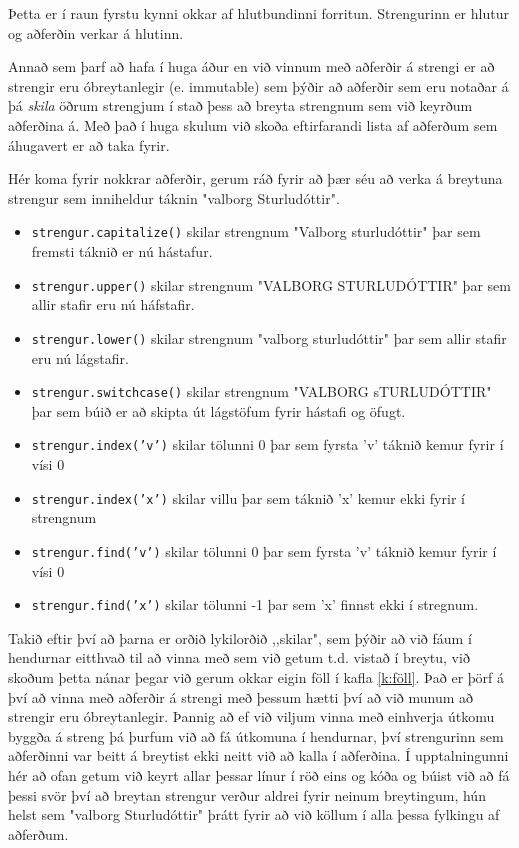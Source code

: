 Þetta er í raun fyrstu kynni okkar af hlutbundinni forritun.
Strengurinn er hlutur og aðferðin verkar á hlutinn.

Annað sem þarf að hafa í huga áður en við vinnum með aðferðir á strengi er að strengir eru óbreytanlegir (e. immutable) sem þýðir að aðferðir sem eru notaðar á þá \emph{skila} öðrum strengjum í stað þess að breyta strengnum sem við keyrðum aðferðina á.
Með það í huga skulum við skoða eftirfarandi lista af aðferðum sem áhugavert er að taka fyrir.
\vspace{10px}

Hér koma fyrir nokkrar aðferðir, gerum ráð fyrir að þær séu að verka á breytuna strengur sem inniheldur táknin "valborg Sturludóttir".
\vspace{5px}
\begin{itemize}
	\item \texttt{strengur.capitalize()} skilar strengnum "Valborg sturludóttir" þar sem fremsti táknið er nú hástafur.
	\item \texttt{strengur.upper()} skilar strengnum "VALBORG STURLUDÓTTIR" þar sem allir stafir eru nú háfstafir.
	\item \texttt{strengur.lower()} skilar strengnum "valborg sturludóttir" þar sem allir stafir eru nú lágstafir.
	\item \texttt{strengur.switchcase()} skilar strengnum "VALBORG sTURLUDÓTTIR" þar sem búið er að skipta út lágstöfum fyrir hástafi og öfugt.
	\item \texttt{strengur.index('v')} skilar tölunni 0 þar sem fyrsta 'v' táknið kemur fyrir í vísi 0
	\item \texttt{strengur.index('x')} skilar villu þar sem táknið 'x' kemur ekki fyrir í strengnum
	\item \texttt{strengur.find('v')} skilar tölunni 0 þar sem fyrsta 'v' táknið kemur fyrir í vísi 0
	\item \texttt{strengur.find('x')} skilar tölunni -1 þar sem 'x' finnst ekki í stregnum. 
\end{itemize}
\vspace{10px}

Takið eftir því að þarna er orðið lykilorðið ,,skilar", sem þýðir að við fáum í hendurnar eitthvað til að vinna með sem við getum t.d. vistað í breytu, við skoðum þetta nánar þegar við gerum okkar eigin föll í kafla \ref{k:föll}.
Það er þörf á því að vinna með aðferðir á strengi með þessum hætti því að við munum að strengir eru óbreytanlegir.
Þannig að ef við viljum vinna með einhverja útkomu byggða á streng þá þurfum við að fá útkomuna í hendurnar, því strengurinn sem aðferðinni var beitt á breytist ekki neitt við að kalla í aðferðina.
Í upptalningunni hér að ofan getum við keyrt allar þessar línur í röð eins og kóða og búist við að fá þessi svör því að breytan strengur verður aldrei fyrir neinum breytingum, hún helst sem "valborg Sturludóttir" þrátt fyrir að við köllum í alla þessa fylkingu af aðferðum.

